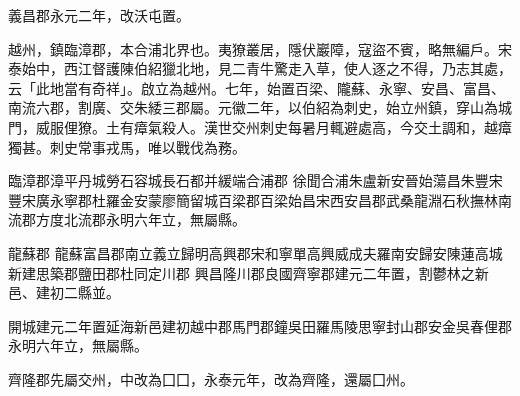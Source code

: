 \begin{pinyinscope}
 義昌郡永元二年，改沃屯置。



 越州，鎮臨漳郡，本合浦北界也。夷獠叢居，隱伏巖障，寇盜不賓，略無編戶。宋泰始中，西江督護陳伯紹獵北地，見二青牛驚走入草，使人逐之不得，乃志其處，云「此地當有奇祥」。啟立為越州。七年，始置百梁、隴蘇、永寧、安昌、富昌、南流六郡，割廣、交朱緌三郡屬。元徽二年，以伯紹為刺史，始立州鎮，穿山為城門，威服俚獠。土有瘴氣殺人。漢世交州刺史每暑月輒避處高，今交土調和，越瘴獨甚。刺史常事戎馬，唯以戰伐為務。



 臨漳郡漳平丹城勞石容城長石都并緩端合浦郡
 徐聞合浦朱盧新安晉始蕩昌朱豐宋豐宋廣永寧郡杜羅金安蒙廖簡留城百梁郡百梁始昌宋西安昌郡武桑龍淵石秋撫林南流郡方度北流郡永明六年立，無屬縣。



 龍蘇郡
 龍蘇富昌郡南立義立歸明高興郡宋和寧單高興威成夫羅南安歸安陳蓮高城新建思築郡鹽田郡杜同定川郡
 興昌隆川郡良國齊寧郡建元二年置，割鬱林之新邑、建初二縣並。



 開城建元二年置延海新邑建初越中郡馬門郡鐘吳田羅馬陵思寧封山郡安金吳春俚郡永明六年立，無屬縣。



 齊隆郡先屬交州，中改為囗囗，永泰元年，改為齊隆，還屬囗州。



\end{pinyinscope}